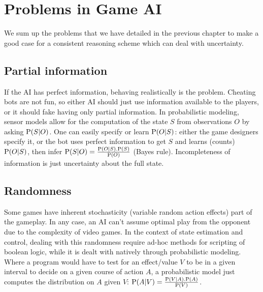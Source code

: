 

\section{Problems in Game AI}
We sum up the problems that we have detailed in the previous chapter to make a good case for a consistent reasoning scheme which can deal with uncertainty.

\subsection{Partial information}
If the AI has perfect information, behaving realistically is the problem. Cheating bots are not fun, so either AI should just use information available to the players, or it should fake having only partial information. In probabilistic modeling, sensor models allow for the computation of the state $S$ from observations $O$ by asking $\mathrm{P}(S|O)$. One can easily specify or learn $\mathrm{P}(O|S)$: either the game designers specify it, or the bot uses perfect information to get $S$ and learns (counts) $\mathrm{P}(O|S)$, then infer $\mathrm{P}(S|O) = \frac{\mathrm{P}(O|S).\mathrm{P}(S)}{\mathrm{P}(O)}$ (Bayes rule). Incompleteness of information is just uncertainty about the full state.

\subsection{Randomness}
Some games have inherent stochasticity (variable random action effects) part of the gameplay. In any case, an AI can't assume optimal play from the opponent due to the complexity of video games. In the context of state estimation and control, dealing with this randomness require ad-hoc methods for scripting of boolean logic, while it is dealt with natively through probabilistic modeling. Where a program would have to test for an effect/value $V$ to be in a given interval to decide on a given course of action $A$, a probabilistic model just computes the distribution on $A$ given $V$: $\mathrm{P}(A|V) = \frac{\mathrm{P}(V|A).\mathrm{P}(A)}{\mathrm{P}(V)}$.

